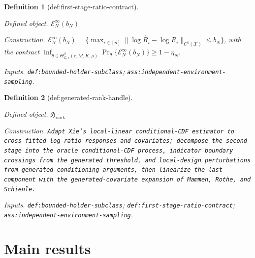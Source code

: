 \documentclass{article}
\newtheorem{definition}{Definition}
\begin{document}
\begin{definition}[def:first-stage-ratio-contract]\label{def:first-stage-ratio-contract}
\par\smallskip\noindent\emph{Defined object.} \(\mathcal E_N^{\infty}(b_N)\)
\par\smallskip\noindent\emph{Construction.} \(\mathcal E_N^{\infty}(b_N)=\{\max_{i\in[n]}\|\log\widehat R_i-\log R_i\|_{C^1(\mathcal X)}\le b_N\}\), with the contract \(\inf_{\theta\in\Theta^{\beta}_{G,s}(c,M,K,\rho)}\Pr_\theta\{\mathcal E_N^{\infty}(b_N)\}\ge1-\eta_N\).
\par\smallskip\noindent\emph{Inputs.} \texttt{def:\allowbreak{}bounded-\allowbreak{}holder-\allowbreak{}subclass}; \texttt{ass:\allowbreak{}independent-\allowbreak{}environment-\allowbreak{}sampling}.
\end{definition}

\begin{definition}[def:generated-rank-handle]\label{def:generated-rank-handle}
\par\smallskip\noindent\emph{Defined object.} \(\mathfrak H_{\mathrm{rank}}\)
\par\smallskip\noindent\emph{Construction.} \texttt{Adapt Xie's local-\allowbreak{}linear conditional-\allowbreak{}CDF estimator to cross-\allowbreak{}fitted log-\allowbreak{}ratio responses and covariates;\allowbreak{} decompose the second stage into the oracle conditional-\allowbreak{}CDF process,\allowbreak{} indicator boundary crossings from the generated threshold,\allowbreak{} and local-\allowbreak{}design perturbations from generated conditioning arguments,\allowbreak{} then linearize the last component with the generated-\allowbreak{}covariate expansion of Mammen,\allowbreak{} Rothe,\allowbreak{} and Schienle.}
\par\smallskip\noindent\emph{Inputs.} \texttt{def:\allowbreak{}bounded-\allowbreak{}holder-\allowbreak{}subclass}; \texttt{def:\allowbreak{}first-\allowbreak{}stage-\allowbreak{}ratio-\allowbreak{}contract}; \texttt{ass:\allowbreak{}independent-\allowbreak{}environment-\allowbreak{}sampling}.
\end{definition}

\section{Main results}
\end{document}
